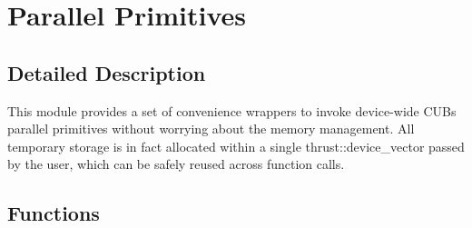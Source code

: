\hypertarget{group___c_u_d_a_primitives}{}\section{Parallel Primitives}
\label{group___c_u_d_a_primitives}


\subsection{Detailed Description}
This module provides a set of convenience wrappers to invoke device-\/wide C\+UB\textquotesingle{}s parallel primitives without worrying about the memory management. All temporary storage is in fact allocated within a single thrust\+::device\+\_\+vector passed by the user, which can be safely reused across function calls. \subsection*{Functions}
